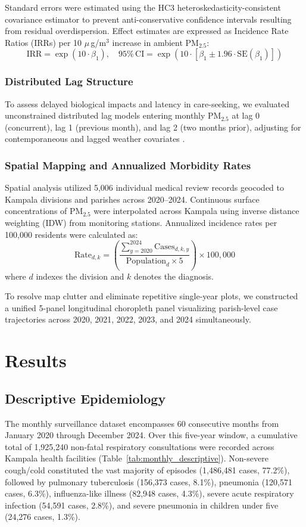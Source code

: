 \documentclass[12pt,a4paper]{report}
\newcommand{\pmfive}{PM$_{2.5}$}
\newcommand{\ugm}{\ensuremath{\mu}\,g/m$^3$}
\begin{document}
Standard errors were estimated using the HC3 heteroskedasticity-consistent covariance estimator to prevent anti-conservative confidence intervals resulting from residual overdispersion. Effect estimates are expressed as Incidence Rate Ratios (IRRs) per 10 \ugm{} increase in ambient \pmfive{}:
\begin{equation}
\mathrm{IRR} = \exp(10 \cdot \beta_1), \quad 95\%\,\mathrm{CI} = \exp(10 \cdot [\beta_1 \pm 1.96 \cdot \mathrm{SE}(\beta_1)])
\end{equation}

\subsection{Distributed Lag Structure}
To assess delayed biological impacts and latency in care-seeking, we evaluated unconstrained distributed lag models entering monthly \pmfive{} at lag 0 (concurrent), lag 1 (previous month), and lag 2 (two months prior), adjusting for contemporaneous and lagged weather covariates \parencite{Gasparrini2010}.

\subsection{Spatial Mapping and Annualized Morbidity Rates}
Spatial analysis utilized 5,006 individual medical review records geocoded to Kampala divisions and parishes across 2020--2024. Continuous surface concentrations of \pmfive{} were interpolated across Kampala using inverse distance weighting (IDW) from monitoring stations. Annualized incidence rates per 100,000 residents were calculated as:
\begin{equation}
\mathrm{Rate}_{d,k} = \left(\frac{\sum_{y=2020}^{2024} \mathrm{Cases}_{d,k,y}}{\text{Population}_{d} \times 5}\right) \times 100{,}000
\end{equation}
where $d$ indexes the division and $k$ denotes the diagnosis.

To resolve map clutter and eliminate repetitive single-year plots, we constructed a unified 5-panel longitudinal choropleth panel visualizing parish-level case trajectories across 2020, 2021, 2022, 2023, and 2024 simultaneously.

\chapter{Results}
\section{Descriptive Epidemiology}
The monthly surveillance dataset encompasses 60 consecutive months from January 2020 through December 2024. Over this five-year window, a cumulative total of 1,925,240 non-fatal respiratory consultations were recorded across Kampala health facilities (Table~\ref{tab:monthly_descriptive}). Non-severe cough/cold constituted the vast majority of episodes (1,486,481 cases, 77.2\%), followed by pulmonary tuberculosis (156,373 cases, 8.1\%), pneumonia (120,571 cases, 6.3\%), influenza-like illness (82,948 cases, 4.3\%), severe acute respiratory infection (54,591 cases, 2.8\%), and severe pneumonia in children under five (24,276 cases, 1.3\%).
\end{document}
